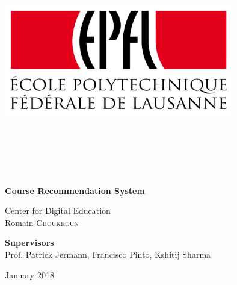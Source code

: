 \documentclass{article}
\begin{document}
\begin{titlepage}
  \begin{center}
    \includegraphics[width=10cm, height=10cm, keepaspectratio]{epfl}
    \vspace*{0.5cm}

    \Huge
    \textbf{Course Recommendation System}

    \vspace{5cm}

    \Large
    Center for Digital Education\\
    \vspace{1cm}
    Romain \textsc{Choukroun}\\

    \vspace{2.3cm}
      \begin{flushleft}
      \textbf{Supervisors}\\
      Prof. Patrick Jermann, Francisco Pinto, Kshitij Sharma
      \end{flushleft}

    \vspace{0.24cm}
    \large
    January 2018

    \end{center}
\end{titlepage}

\newpage
\tableofcontents

\newpage
\end{document}
